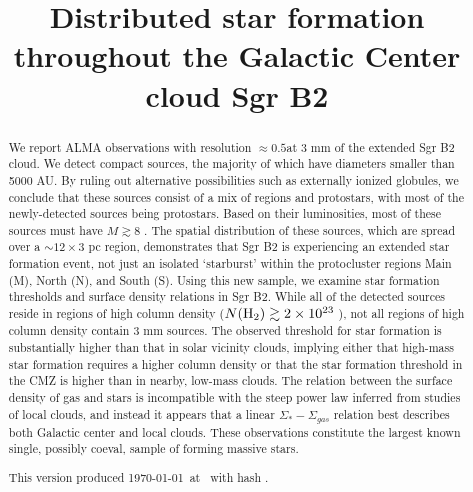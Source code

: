 \documentclass[twocolumn]{aastex61}
\begin{document}
\title{Distributed star formation throughout the Galactic Center cloud Sgr B2}

\begin{abstract}
We report ALMA observations with resolution $\approx0.5$\arcsec at 3 mm  of
the extended Sgr B2 cloud. We detect \ncores compact sources, the majority of
which have diameters smaller than 5000 AU.  By ruling out alternative
possibilities such as externally ionized
globules, we conclude that these sources consist of a mix of \hchii regions
and protostars, with most of the newly-detected sources being protostars.
Based on their luminosities, most of these sources must have $M\gtrsim8$ \msun.
The
spatial distribution of these
sources, which are spread over a $\sim12\times3$ pc region, demonstrates that
Sgr B2 is experiencing an extended star
formation event, not just an isolated `starburst' within the protocluster
regions Main (M), North (N), and South (S).
Using this new sample, we examine star formation thresholds and surface
density relations in Sgr B2.
While all of the detected
sources reside in regions of high column density ($N(\textrm{H}_{2})\gtrsim2\times10^{23}$
\persc), not all regions of high column density
contain 3 mm sources.
The observed threshold for star formation is substantially higher than that in
solar vicinity clouds, implying either that high-mass star formation requires a
higher column density or that the star formation threshold in the CMZ is higher
than in nearby, low-mass clouds.
The relation between the surface density of gas and stars is incompatible
with the steep power law inferred from studies of local clouds, and instead it
appears that a linear $\Sigma_*-\Sigma_{gas}$ relation best describes both
Galactic center and local clouds.
These observations constitute the largest known single, possibly
coeval, sample of forming massive stars.


This version produced \today\ at \currenttime\ with hash \githash.
\end{abstract}
\end{document}
